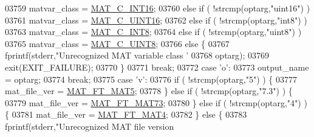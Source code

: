 \begin{DoxyCode}
{{{{{{{{{{{{{{{{{{{{{{{{{{{{{{{{{{{{{{{{{{{{{{{{{{{{{{{{{{{{{{{{03759                     matvar\_class = \hyperlink{group___m_a_t_ggad4d60ae7b709fc81bfd744fb4c857c40a40370e9de516c5036a67a5865c071006}{MAT\_C\_INT16};
03760                 \textcolor{keywordflow}{else} \textcolor{keywordflow}{if} ( !strcmp(optarg,\textcolor{stringliteral}{"uint16"}) )
03761                     matvar\_class = \hyperlink{group___m_a_t_ggad4d60ae7b709fc81bfd744fb4c857c40a8bede21dbf6c1edc0bbccc1481bccae7}{MAT\_C\_UINT16};
03762                 \textcolor{keywordflow}{else} \textcolor{keywordflow}{if} ( !strcmp(optarg,\textcolor{stringliteral}{"int8"}) )
03763                     matvar\_class = \hyperlink{group___m_a_t_ggad4d60ae7b709fc81bfd744fb4c857c40a984ff310f9e906100fcff95f704f43c5}{MAT\_C\_INT8};
03764                 \textcolor{keywordflow}{else} \textcolor{keywordflow}{if} ( !strcmp(optarg,\textcolor{stringliteral}{"uint8"}) )
03765                     matvar\_class = \hyperlink{group___m_a_t_ggad4d60ae7b709fc81bfd744fb4c857c40a81270f8093cb4808e992c1d29d84d4e3}{MAT\_C\_UINT8};
03766                 \textcolor{keywordflow}{else} \{
03767                     fprintf(stderr,\textcolor{stringliteral}{"Unrecognized MAT variable class '%
03768                             optarg);
03769                     exit(EXIT\_FAILURE);
03770                 \}
03771                 \textcolor{keywordflow}{break};
03772             \textcolor{keywordflow}{case} \textcolor{charliteral}{'o'}:
03773                 output\_name = optarg;
03774                 \textcolor{keywordflow}{break};
03775             \textcolor{keywordflow}{case} \textcolor{charliteral}{'v'}:
03776                 \textcolor{keywordflow}{if} ( !strcmp(optarg,\textcolor{stringliteral}{"5"}) ) \{
03777                     mat\_file\_ver = \hyperlink{group___m_a_t_ggad03442b8378999189d510e3745c702b7a31ade1f6989411dc0299007e2c7d33b2}{MAT\_FT\_MAT5};
03778                 \} \textcolor{keywordflow}{else} \textcolor{keywordflow}{if} ( !strcmp(optarg,\textcolor{stringliteral}{"7.3"}) ) \{
03779                     mat\_file\_ver = \hyperlink{group___m_a_t_ggad03442b8378999189d510e3745c702b7a765c5d1d5038947646260dc82483517e}{MAT\_FT\_MAT73};
03780                 \} \textcolor{keywordflow}{else} \textcolor{keywordflow}{if} ( !strcmp(optarg,\textcolor{stringliteral}{"4"}) ) \{
03781                     mat\_file\_ver = \hyperlink{group___m_a_t_ggad03442b8378999189d510e3745c702b7a858b4f5da65548219b1c3ad47aa478d3}{MAT\_FT\_MAT4};
03782                 \} \textcolor{keywordflow}{else} \{
03783                     fprintf(stderr,\textcolor{stringliteral}{"Unrecognized MAT file version %
}}}}}}}}}}}}}}}}}}}}}}}}}}}}}}}}}}}}}}}}}}}}}}}}}}}}}}}}}}}}}}}}}}
\end{DoxyCode}
